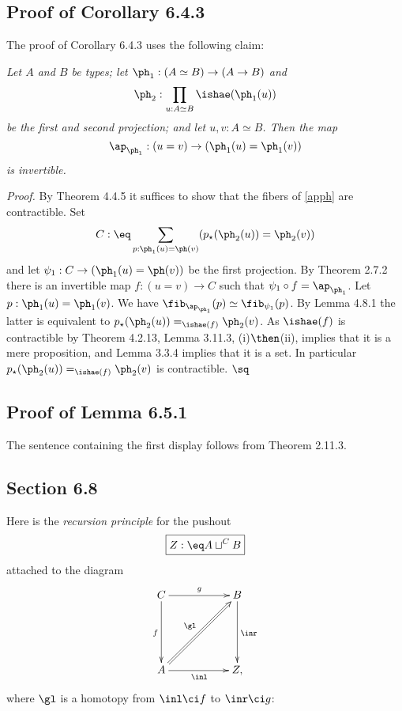 \documentclass[12pt]{article}
\begin{document}

\subsection{Proof of Corollary 6.4.3} %


The proof of Corollary 6.4.3 uses the following claim:

\nn{} \emph{Let $A$ and $B$ be types; let $\ph_1:(A\simeq B)\to(A\to B)$ and 
$$
\ph_2:\prod_{u:A\simeq B}\ishae(\ph_1(u))
$$ 
be the first and second projection; and let $u,v:A\simeq B$. Then the map 
\begin{equation}\label{apph}
\ap_{\ph_1}:(u=v)\to(\ph_1(u)=\ph_1(v))
\end{equation}
is invertible.}

\nn\emph{Proof.} By Theorem 4.4.5 it suffices to show that the fibers of \eqref{apph} are contractible. Set 
$$
C:\eq\sum_{p:\ph_1(u)=\ph(v)}(p_\star(\ph_2(u))=\ph_2(v))
$$ 
and let $\psi_1:C\to(\ph_1(u)=\ph(v))$ be the first projection. By Theorem 2.7.2 there is an invertible map $f:(u=v)\to C$ such that $\psi_1\circ f=\ap_{\ph_1}$. Let $p:\ph_1(u)=\ph_1(v)$. We have $\fib_{\ap_{\ph_1}}(p)\simeq\fib_{\psi_1}(p)$. By Lemma 4.8.1 the latter is equivalent to $p_\star(\ph_2(u))=_{\ishae(f)}\ph_2(v)$. As $\ishae(f)$ is contractible by Theorem 4.2.13, Lemma 3.11.3, (i)$\then$(ii), implies that it is a mere proposition, and Lemma 3.3.4 implies that it is a set. In particular $p_\star(\ph_2(u))=_{\ishae(f)}\ph_2(v)$ is contractible. $\sq$


\subsection{Proof of Lemma 6.5.1}

The sentence containing the first display follows from Theorem 2.11.3.


\subsection{Section 6.8}

Here is the \emph{recursion principle} for the pushout 
$$
\boxed{Z:\eq A\sqcup^CB}
$$ 
attached to the diagram 
$$
\xymatrix{
C\ar[rr]^g\ar[dd]_f&&B\ar[dd]^{\inr}\\ \\ 
A\ar[rr]_{\inl}\ar@{=>}[uurr]^{\gl}&&Z,
}
$$ 
where $\gl$ is a homotopy from $\inl\ci f$ to $\inr\ci g$: 
\end{document}
